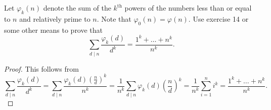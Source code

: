 \documentclass[10pt]{amsart}
\begin{document}
\begin{thm}
  Let $\varphi_k(n)$ denote the sum of the $k^\text{th}$ powers of the numbers less than or equal to $n$ and relatively prime to $n$.
  Note that $\varphi_0(n) = \varphi(n)$.
  Use exercise 14 or some other means to prove that
  $$\sum_{d \mid n} \frac{\varphi_k(d)}{d^k} = \frac{1^k + \ldots + n^k}{n^k}.$$
  
  \begin{proof}
    This follows from 
    $$\sum_{d \mid n} \frac{\varphi_k(d)}{d^k} = \sum_{d \mid n} \frac{\varphi_k(d)\left(\frac{n}{d}\right)^k}{n^k} = \frac{1}{n^k}\sum_{d \mid n} \varphi_k(d)\left(\frac{n}{d}\right)^k = \frac{1}{n^k}\sum_{i = 1}^n i^k = \frac{1^k + \ldots + n^k}{n^k}.$$
  \end{proof}
\end{thm}
\end{document}
